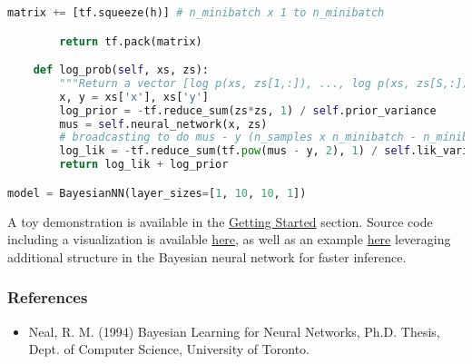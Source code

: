 \begin{lstlisting}[language=Python]
            matrix += [tf.squeeze(h)] # n_minibatch x 1 to n_minibatch

        return tf.pack(matrix)

    def log_prob(self, xs, zs):
        """Return a vector [log p(xs, zs[1,:]), ..., log p(xs, zs[S,:])]."""
        x, y = xs['x'], xs['y']
        log_prior = -tf.reduce_sum(zs*zs, 1) / self.prior_variance
        mus = self.neural_network(x, zs)
        # broadcasting to do mus - y (n_samples x n_minibatch - n_minibatch)
        log_lik = -tf.reduce_sum(tf.pow(mus - y, 2), 1) / self.lik_variance
        return log_lik + log_prior

model = BayesianNN(layer_sizes=[1, 10, 10, 1])
\end{lstlisting}

A toy demonstration is available in the \href{getting-started}{Getting Started} section.
Source code including a visualization is available
\href{https://github.com/blei-lab/edward/blob/master/examples/bayesian_nn.py}
{here}, as well as an example
\href{https://github.com/blei-lab/edward/blob/master/examples/bayesian_nn_analytic_kl.py}
{here}
leveraging additional structure in the
Bayesian neural network for faster inference.

\subsubsection{References}\label{references}

\begin{itemize}
\item
  Neal, R. M. (1994) Bayesian Learning for Neural Networks, Ph.D.
  Thesis, Dept. of Computer Science, University of Toronto.
\end{itemize}

